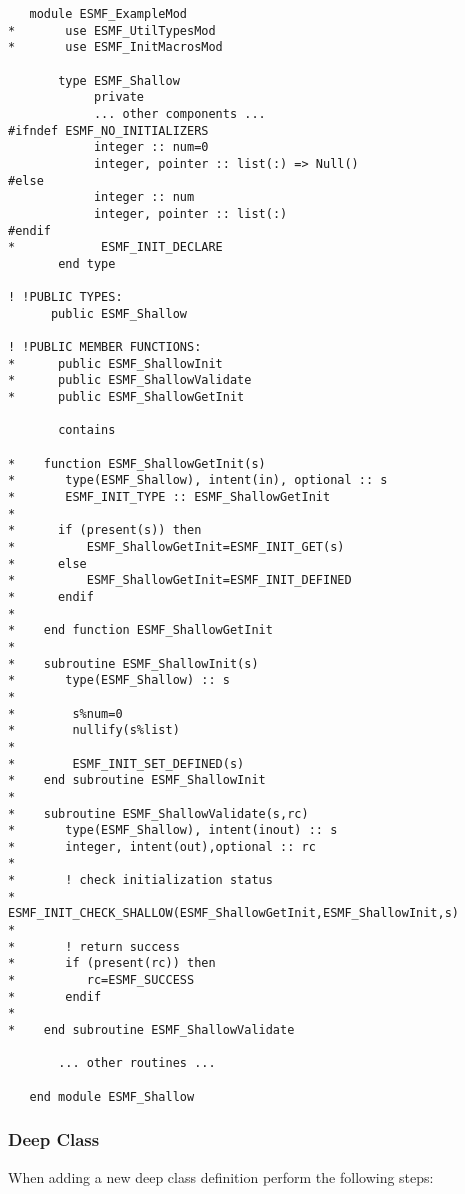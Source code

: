 \begin{verbatim}
   module ESMF_ExampleMod
*       use ESMF_UtilTypesMod 
*       use ESMF_InitMacrosMod 

       type ESMF_Shallow
            private
            ... other components ...
#ifndef ESMF_NO_INITIALIZERS
            integer :: num=0
            integer, pointer :: list(:) => Null()
#else
            integer :: num
            integer, pointer :: list(:)
#endif
*            ESMF_INIT_DECLARE
       end type

! !PUBLIC TYPES:
      public ESMF_Shallow 

! !PUBLIC MEMBER FUNCTIONS:
*      public ESMF_ShallowInit
*      public ESMF_ShallowValidate
*      public ESMF_ShallowGetInit

       contains

*    function ESMF_ShallowGetInit(s)
*       type(ESMF_Shallow), intent(in), optional :: s
*       ESMF_INIT_TYPE :: ESMF_ShallowGetInit
*
*      if (present(s)) then
*          ESMF_ShallowGetInit=ESMF_INIT_GET(s)
*      else
*          ESMF_ShallowGetInit=ESMF_INIT_DEFINED
*      endif
*
*    end function ESMF_ShallowGetInit
*
*    subroutine ESMF_ShallowInit(s)
*       type(ESMF_Shallow) :: s
*    
*        s%num=0 
*        nullify(s%list)
*
*        ESMF_INIT_SET_DEFINED(s) 
*    end subroutine ESMF_ShallowInit
*
*    subroutine ESMF_ShallowValidate(s,rc)
*       type(ESMF_Shallow), intent(inout) :: s
*       integer, intent(out),optional :: rc
*
*       ! check initialization status
*       ESMF_INIT_CHECK_SHALLOW(ESMF_ShallowGetInit,ESMF_ShallowInit,s)
*       
*       ! return success
*       if (present(rc)) then
*          rc=ESMF_SUCCESS
*       endif
*
*    end subroutine ESMF_ShallowValidate

       ... other routines ...

   end module ESMF_Shallow
\end{verbatim}

\subsubsection{Deep Class}

 When adding a new deep class definition perform the following steps:

